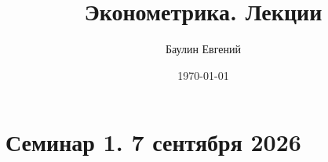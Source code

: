 \documentclass[12pt,a4paper]{article}
\title{Эконометрика. Лекции}
\author{Баулин Евгений}
\date{\today}
\numberwithin{equation}{section}
\theoremstyle{plain}
\theoremstyle{definition}
\theoremstyle{remark}
\begin{document}

\maketitle
\tableofcontents
\clearpage

\section{Семинар 1. 7 сентября 2026}
\end{document}
